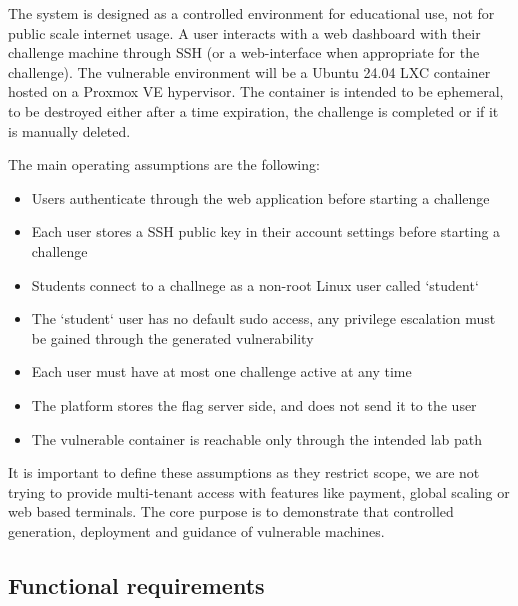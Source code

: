 The system is designed as a controlled environment for educational use, not for public scale internet usage. A user interacts with a web dashboard with their challenge machine through SSH (or a web-interface when appropriate for the challenge). The vulnerable environment will be a Ubuntu 24.04 LXC container hosted on a Proxmox VE hypervisor. The container is intended to be ephemeral, to be destroyed either after a time expiration, the challenge is completed or if it is manually deleted.  

The main operating assumptions are the following:
\begin{itemize}
    \item Users authenticate through the web application before starting a challenge
    \item Each user stores a SSH public key in their account settings before starting a challenge
    \item Students connect to a challnege as a non-root Linux user called `student`
    \item The `student` user has no default sudo access, any privilege escalation must be gained through the generated vulnerability
    \item Each user must have at most one challenge active at any time
    \item The platform stores the flag server side, and does not send it to the user
    \item The vulnerable container is reachable only through the intended lab path
\end{itemize}

It is important to define these assumptions as they restrict scope, we are not trying to provide multi-tenant access with features like payment, global scaling or web based terminals. The core purpose is to demonstrate that controlled generation, deployment and guidance of vulnerable machines.

\subsection{Functional requirements}\label{sec:functional_requirements}

